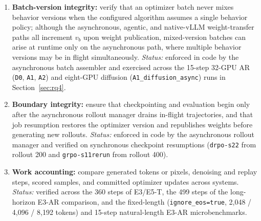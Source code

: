 \documentclass[10pt]{article}
\begin{document}
\begin{enumerate}
  \emph{Status:} measured post-publication for five of the six synchronization configurations in E0 smoke runs---reaching at most \EZeroDiffusionAfterLargest{} on the diffusion paths (Table~\ref{tab:parity-smoke})---and after every weight publication across the six formal E1 runs and the seed 11 rerun (\EOneParityChecks{} checks in total; Table~\ref{tab:parity-e1}). Across the E1 runs, the per-rollout mean absolute difference has a run-level median of \EOneParityMedianMin{}--\EOneParityMedianMax{} and a maximum of \EOneParityMeanLargest{}, whereas the single-token maximum reaches \EOneParityTokenLargest{}. The formal E1 runs logged this gauge without a configured tolerance; relative to the nominal \EOneGateTolerance{} probe reference, every per-rollout mean falls below \EOneGateTolerance{} while every single-token maximum exceeds it. No formal acceptance threshold has been established for either statistic, and no experiment in this report uses the sixth configuration (\texttt{CheckpointWeightSync}).
  \item \textbf{Batch-version integrity:} verify that an optimizer batch never mixes behavior versions when the configured algorithm assumes a single behavior policy; although the asynchronous, agentic, and native-vLLM weight-transfer paths all increment $v_b$ upon weight publication, mixed-version batches can arise at runtime only on the asynchronous path, where multiple behavior versions may be in flight simultaneously.
  \emph{Status:} enforced in code by the asynchronous batch assembler and exercised across the 15-step 32-GPU AR (\texttt{D0}, \texttt{A1}, \texttt{A2}) and eight-GPU diffusion (\texttt{A1\_diffusion\_async}) runs in Section~\ref{sec:rq4}.
  \item \textbf{Boundary integrity:} ensure that checkpointing and evaluation begin only after the asynchronous rollout manager drains in-flight trajectories, and that job resumption restores the optimizer version and republishes weights before generating new rollouts.
  \emph{Status:} enforced in code by the asynchronous rollout manager and verified on synchronous checkpoint resumptions (\texttt{drpo-s22} from rollout 200 and \texttt{grpo-s11rerun} from rollout 400).
  \item \textbf{Work accounting:} compare generated tokens or pixels, denoising and replay steps, scored samples, and committed optimizer updates across systems.
  \emph{Status:} verified across the 360 steps of E3/E5-T, the 499 steps of the long-horizon E3-AR comparison, and the fixed-length (\texttt{ignore\_eos=true}, 2,048 / 4,096 / 8,192 tokens) and 15-step natural-length E3-AR microbenchmarks.

\end{enumerate}
\end{document}
